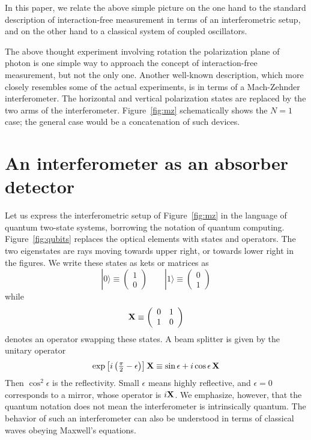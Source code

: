 \documentclass[12pt,aps,prb,preprint]{revtex4}
\def\ket#1{|#1\rangle}
\def\X{{\bf X}}
\begin{document}
In this paper, we relate the above simple picture on the one hand to
the standard description of interaction-free measurement in terms of
an interferometric setup, and on the other hand to a classical system
of coupled oscillators.

The above thought experiment involving rotation the polarization plane
of photon is one simple way to approach the concept of
interaction-free measurement, but not the only one.  Another
well-known description, which more closely resembles some of the
actual experiments, is in terms of a Mach-Zehnder interferometer.  The
horizontal and vertical polarization states are replaced by the two
arms of the interferometer.  Figure~\ref{fig:mz} schematically shows
the $N=1$ case; the general case would be a concatenation of such
devices.

\section{An interferometer as an absorber detector}

Let us express the interferometric setup of Figure~\ref{fig:mz} in the
language of quantum two-state systems, borrowing the notation of
quantum computing.  Figure~\ref{fig:qubits} replaces the optical
elements with states and operators.  The two eigenstates are rays
moving towards upper right, or towards lower right in the figures. We
write these states as kets or matrices as
\begin{equation}
\ket0 \equiv \left( \begin{array}{c} 1 \\ 0 \end{array} \right)  \qquad
\ket1 \equiv \left( \begin{array}{c} 0 \\ 1 \end{array} \right)
\end{equation}
while
\begin{equation}
\X \equiv \left( \begin{array}{cc} 0 & 1 \\ 1 & 0 \end{array} \right)
\end{equation}
denotes an operator swapping these states.  A beam splitter is given
by the unitary operator
\begin{equation}
\exp\left[i\left({\textstyle\frac\pi2-\epsilon}\right)\right] \X \equiv
\sin\epsilon + i\cos\epsilon\,\X
\end{equation}
Then $\cos^2\epsilon$ is the reflectivity.  Small $\epsilon$ means
highly reflective, and $\epsilon=0$ corresponds to a mirror, whose
operator is $i\X$.  We emphasize, however, that the quantum notation
does not mean the interferometer is intrinsically quantum.  The
behavior of such an interferometer can also be understood in terms of
classical waves obeying Maxwell's equations.
\end{document}
